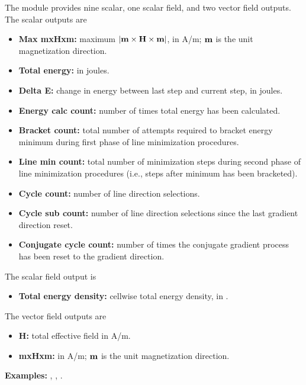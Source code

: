 \begin{description}
The  module provides nine scalar, one scalar
 field, and two vector field outputs.  The scalar outputs are
\begin{itemize}
\item \textbf{Max mxHxm:} maximum $|\textbf{m}\times\textbf{H}\times\textbf{m}|$, in A/m;
   $\textbf{m}$ is the unit magnetization direction.
\item \textbf{Total energy:} in joules.
\item \textbf{Delta E:} change in energy between last step and current
   step, in joules.
\item \textbf{Energy calc count:} number of times total energy has been
   calculated.
\item \textbf{Bracket count:} total number of attempts required to
   bracket energy minimum during first phase of line minimization
   procedures.
\item \textbf{Line min count:} total number of minimization steps during
   second phase of line minimization procedures (i.e., steps after
   minimum has been bracketed).
\item \textbf{Cycle count:} number of line direction selections.
\item \textbf{Cycle sub count:} number of line direction selections
  since the last gradient direction reset.
\item \textbf{Conjugate cycle count:} number of times the conjugate gradient
   process has been reset to the gradient direction.
\end{itemize}

The scalar field output is
\begin{itemize}
\item \textbf{Total energy density:} cellwise total energy density, in
.
\end{itemize}

The vector field outputs are
\begin{itemize}
\item \textbf{H:} total effective field in A/m.
\item \textbf{mxHxm:} in A/m; $\textbf{m}$ is the unit magnetization
   direction.
\end{itemize}

\textbf{Examples:} , , .

\end{description}

